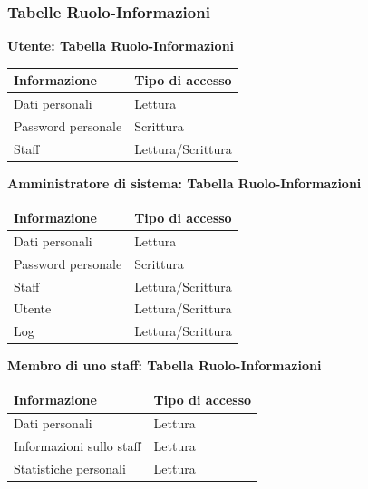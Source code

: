 \documentclass[a4paper]{article}
\begin{document}
\newpage

\subsubsection{Tabelle Ruolo-Informazioni}

\textbf{Utente: Tabella Ruolo-Informazioni}

\begin{center}
    \begin{tabularx}{1\textwidth}{|X|X|}
    \hline
    \textbf{Informazione} & \textbf{Tipo di accesso} \\
    \hline
    \hline
    Dati personali & Lettura\\
    \hline
    Password personale & Scrittura\\
    \hline
    Staff & Lettura/Scrittura\\
    \hline
    \end{tabularx}
\end{center}

\textbf{Amministratore di sistema: Tabella Ruolo-Informazioni}

\begin{center}
    \begin{tabularx}{1\textwidth}{|X|X|}
    \hline
    \textbf{Informazione} & \textbf{Tipo di accesso} \\
    \hline
    \hline
    Dati personali & Lettura\\
    \hline
    Password personale & Scrittura\\
    \hline
    Staff & Lettura/Scrittura\\
    \hline
    Utente & Lettura/Scrittura\\
    \hline
    Log & Lettura/Scrittura\\
    \hline
    \end{tabularx}
\end{center}

\textbf{Membro di uno staff: Tabella Ruolo-Informazioni}

\begin{center}
    \begin{tabularx}{1\textwidth}{|X|X|}
    \hline
    \textbf{Informazione} & \textbf{Tipo di accesso} \\
    \hline
    \hline
    Dati personali & Lettura\\
    \hline
    Informazioni sullo staff & Lettura\\
    \hline
    Statistiche personali & Lettura\\
    \hline
    \end{tabularx}
\end{center}
\end{document}
